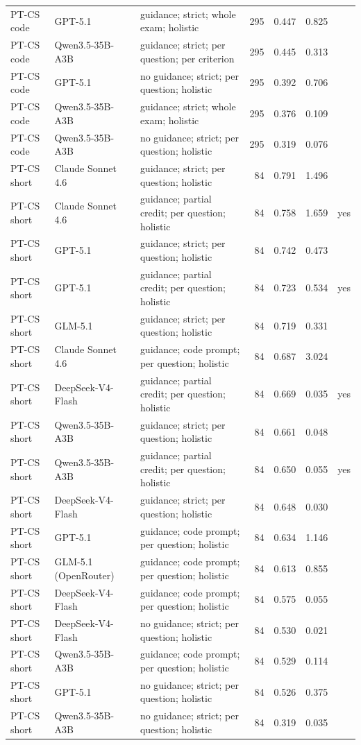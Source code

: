 \documentclass[10pt]{article}
\begin{document}
\begin{longtable}{ll>{\raggedright\arraybackslash}p{5.2cm}rrrc}
PT-CS code & GPT-5.1 & guidance; strict; whole exam; holistic & 295 & 0.447 & 0.825 &  \\
PT-CS code & Qwen3.5-35B-A3B & guidance; strict; per question; per criterion & 295 & 0.445 & 0.313 &  \\
PT-CS code & GPT-5.1 & no guidance; strict; per question; holistic & 295 & 0.392 & 0.706 &  \\
PT-CS code & Qwen3.5-35B-A3B & guidance; strict; whole exam; holistic & 295 & 0.376 & 0.109 &  \\
PT-CS code & Qwen3.5-35B-A3B & no guidance; strict; per question; holistic & 295 & 0.319 & 0.076 &  \\
PT-CS short & Claude Sonnet 4.6 & guidance; strict; per question; holistic & 84 & 0.791 & 1.496 &  \\
PT-CS short & Claude Sonnet 4.6 & guidance; partial credit; per question; holistic & 84 & 0.758 & 1.659 & yes \\
PT-CS short & GPT-5.1 & guidance; strict; per question; holistic & 84 & 0.742 & 0.473 &  \\
PT-CS short & GPT-5.1 & guidance; partial credit; per question; holistic & 84 & 0.723 & 0.534 & yes \\
PT-CS short & GLM-5.1 & guidance; strict; per question; holistic & 84 & 0.719 & 0.331 &  \\
PT-CS short & Claude Sonnet 4.6 & guidance; code prompt; per question; holistic & 84 & 0.687 & 3.024 &  \\
PT-CS short & DeepSeek-V4-Flash & guidance; partial credit; per question; holistic & 84 & 0.669 & 0.035 & yes \\
PT-CS short & Qwen3.5-35B-A3B & guidance; strict; per question; holistic & 84 & 0.661 & 0.048 &  \\
PT-CS short & Qwen3.5-35B-A3B & guidance; partial credit; per question; holistic & 84 & 0.650 & 0.055 & yes \\
PT-CS short & DeepSeek-V4-Flash & guidance; strict; per question; holistic & 84 & 0.648 & 0.030 &  \\
PT-CS short & GPT-5.1 & guidance; code prompt; per question; holistic & 84 & 0.634 & 1.146 &  \\
PT-CS short & GLM-5.1 (OpenRouter) & guidance; code prompt; per question; holistic & 84 & 0.613 & 0.855 &  \\
PT-CS short & DeepSeek-V4-Flash & guidance; code prompt; per question; holistic & 84 & 0.575 & 0.055 &  \\
PT-CS short & DeepSeek-V4-Flash & no guidance; strict; per question; holistic & 84 & 0.530 & 0.021 &  \\
PT-CS short & Qwen3.5-35B-A3B & guidance; code prompt; per question; holistic & 84 & 0.529 & 0.114 &  \\
PT-CS short & GPT-5.1 & no guidance; strict; per question; holistic & 84 & 0.526 & 0.375 &  \\
PT-CS short & Qwen3.5-35B-A3B & no guidance; strict; per question; holistic & 84 & 0.319 & 0.035 &  \\
\hline
\end{longtable}
\endgroup
\end{document}
